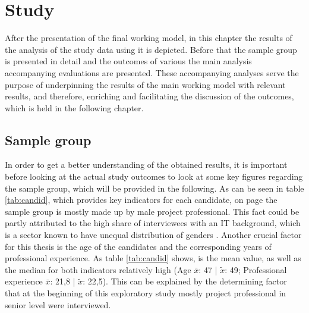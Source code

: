 \cleardoublepage

\section{Study}
\label{sec:study}
After the presentation of the final working model, in this chapter the results of the analysis of the study data using it is depicted. Before that the sample group is presented in detail and the outcomes of various the main analysis accompanying evaluations are presented. These accompanying analyses serve the purpose of underpinning the results of the main working model with relevant results, and therefore, enriching and facilitating the discussion of the outcomes, which is held in the following chapter.


\subsection{Sample group}
In order to get a better understanding of the obtained results, it is important before looking at the actual study outcomes to look at some key figures regarding the sample group, which will be provided in the following. As can be seen in table \ref{tab:candid}, which provides key indicators for each candidate, on page \pageref{tab:candid} the sample group is mostly made up by male project professional. This fact could be partly attributed to the high share of interviewees with an IT background, which is a sector known to have unequal distribution of genders \cite{harrington15}. Another crucial factor for this thesis is the age of the candidates and the corresponding years of professional experience. As table \ref{tab:candid} shows, is the mean value, as well as the median for both indicators relatively high (Age $\bar{x}$: 47 | $\tilde{x}$: 49; Professional experience $\bar{x}$: 21,8 | $\tilde{x}$: 22,5). This can be explained by the determining factor that at the beginning of this exploratory study mostly project professional in senior level were interviewed.\\

